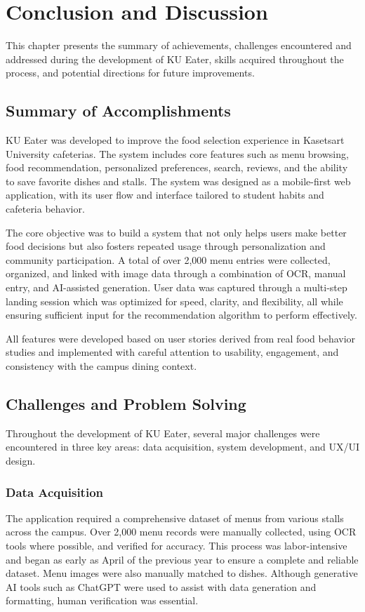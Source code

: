 \chapter{Conclusion and Discussion}
\label{chap:conclusion-discussion}
This chapter presents the summary of achievements, challenges encountered and addressed during the development of KU Eater, skills acquired throughout the process, and potential directions for future improvements.

\section{Summary of Accomplishments}
\label{section:summary-of-accomplishments}
KU Eater was developed to improve the food selection experience in Kasetsart University cafeterias. The system includes core features such as menu browsing, food recommendation, personalized preferences, search, reviews, and the ability to save favorite dishes and stalls. The system was designed as a mobile-first web application, with its user flow and interface tailored to student habits and cafeteria behavior.

The core objective was to build a system that not only helps users make better food decisions but also fosters repeated usage through personalization and community participation. A total of over 2,000 menu entries were collected, organized, and linked with image data through a combination of OCR, manual entry, and AI-assisted generation. User data was captured through a multi-step landing session which was optimized for speed, clarity, and flexibility, all while ensuring sufficient input for the recommendation algorithm to perform effectively.

All features were developed based on user stories derived from real food behavior studies and implemented with careful attention to usability, engagement, and consistency with the campus dining context.

\section{Challenges and Problem Solving}
\label{section:challenges-problem-solve}
Throughout the development of KU Eater, several major challenges were encountered in three key areas: data acquisition, system development, and UX/UI design.

\subsection{Data Acquisition}
\label{subsection:data-acquisition-challenge}
The application required a comprehensive dataset of menus from various stalls across the campus. Over 2,000 menu records were manually collected, using OCR tools where possible, and verified for accuracy. This process was labor-intensive and began as early as April of the previous year to ensure a complete and reliable dataset. Menu images were also manually matched to dishes. Although generative AI tools such as ChatGPT were used to assist with data generation and formatting, human verification was essential.

